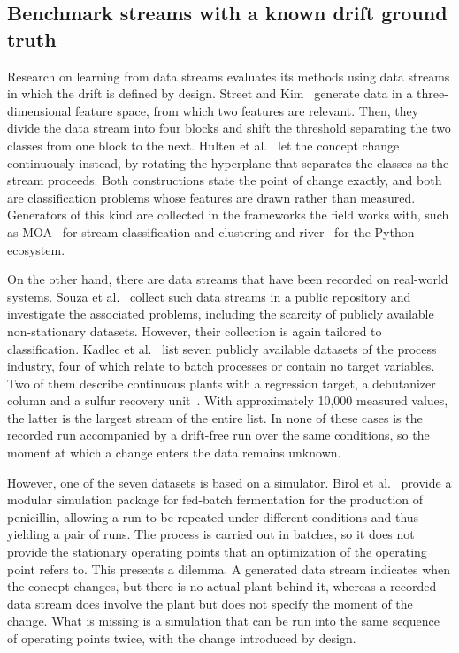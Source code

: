 \subsection{Benchmark streams with a known drift ground truth} \label{subsec:benchmarks}

Research on learning from data streams evaluates its methods using data streams in which the drift is defined by design. Street and Kim~\cite{street.2001} generate data in a three-dimensional feature space, from which two features are relevant. Then, they divide the data stream into four blocks and shift the threshold separating the two classes from one block to the next. Hulten et al.~\cite{hulten.2001} let the concept change continuously instead, by rotating the hyperplane that separates the classes as the stream proceeds. Both constructions state the point of change exactly, and both are classification problems whose features are drawn rather than measured. Generators of this kind are collected in the frameworks the field works with, such as MOA~\cite{bifet.2010} for stream classification and clustering and river~\cite{montiel.2021} for the Python ecosystem. \par
%
On the other hand, there are data streams that have been recorded on real-world systems. Souza et al.~\cite{souza.2020} collect such data streams in a public repository and investigate the associated problems, including the scarcity of publicly available non-stationary datasets. However, their collection is again tailored to classification. Kadlec et al.~\cite{kadlec.2011} list seven publicly available datasets of the process industry, four of which relate to batch processes or contain no target variables. Two of them describe continuous plants with a regression target, a debutanizer column and a sulfur recovery unit~\cite{fortuna.2007}. With approximately 10,000 measured values, the latter is the largest stream of the entire list. In none of these cases is the recorded run accompanied by a drift-free run over the same conditions, so the moment at which a change enters the data remains unknown. \par
%
However, one of the seven datasets is based on a simulator. Birol et al.~\cite{birol.2002} provide a modular simulation package for fed-batch fermentation for the production of penicillin, allowing a run to be repeated under different conditions and thus yielding a pair of runs. The process is carried out in batches, so it does not provide the stationary operating points that an optimization of the operating point refers to.
This presents a dilemma. A generated data stream indicates when the concept changes, but there is no actual plant behind it, whereas a recorded data stream does involve the plant but does not specify the moment of the change. What is missing is a simulation that can be run into the same sequence of operating points twice, with the change introduced by design. \par
%

